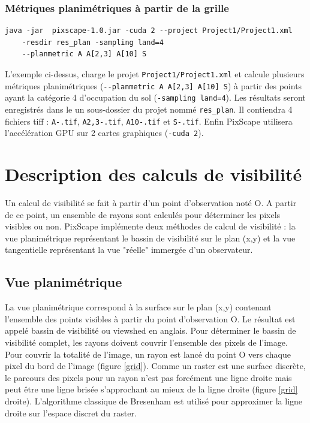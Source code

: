 \documentclass{report}
\begin{document}
\subsection{Métriques planimétriques à partir de la grille}
\begin{Verbatim}
java -jar  pixscape-1.0.jar -cuda 2 --project Project1/Project1.xml
	-resdir res_plan -sampling land=4 
	--planmetric A A[2,3] A[10] S
\end{Verbatim}
L'exemple ci-dessus, charge le projet \verb|Project1/Project1.xml| et calcule plusieurs métriques planimétriques (\verb|--planmetric A A[2,3] A[10] S|) à partir des points ayant la catégorie 4 d'occupation du sol (\verb|-sampling land=4|). Les résultats seront enregistrés dans le un sous-dossier du projet nommé \verb|res_plan|. Il contiendra 4 fichiers tiff : \verb|A-.tif|, \verb|A2,3-.tif|, \verb|A10-.tif| et \verb|S-.tif|. Enfin PixScape utilisera l'accélération GPU sur 2 cartes graphiques (\verb|-cuda 2|).


\chapter{Description des calculs de visibilité}
\label{principles}
Un calcul de visibilité se fait à partir d'un point d'observation noté O. A partir de ce point, un ensemble de rayons sont calculés pour déterminer les pixels visibles ou non. 
PixScape implémente deux méthodes de calcul de visibilité : la vue planimétrique représentant le bassin de visibilité sur le plan (x,y) et la vue tangentielle représentant la vue "réelle" immergée d'un observateur.

\section{Vue planimétrique}
La vue planimétrique correspond à la surface sur le plan (x,y) contenant l'ensemble des points visibles à partir du point d'observation O. Le résultat est appelé bassin de visibilité ou viewshed en anglais.
Pour déterminer le bassin de visibilité complet, les rayons doivent couvrir l'ensemble des pixels de l'image.
Pour couvrir la totalité de l'image, un rayon est lancé du point O vers chaque pixel du bord de l'image (figure \ref{grid}). Comme un raster est une surface discrète, le parcours des pixels pour un rayon n'est pas forcément une ligne droite mais peut être une ligne brisée s'approchant au mieux de la ligne droite (figure \ref{grid} droite). L'algorithme classique de Bresenham est utilisé pour approximer la ligne droite sur l'espace discret du raster.
\end{document}
